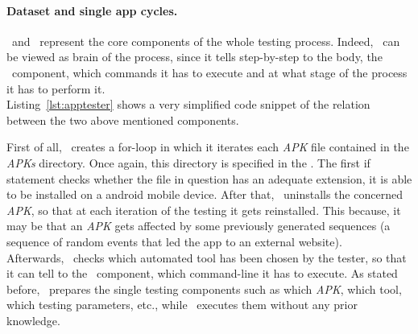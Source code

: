 \paragraph{Dataset and single app cycles. } 
\AppTester\ and \Cmd\ represent the core components of the whole testing process. Indeed, \AppTester\ can be viewed as brain of the process, since it tells step-by-step to the body, \ie the \Cmd\ component, which commands it has to execute and at what stage of the process it has to perform it. \\
Listing~\ref{lst:apptester} shows a very simplified code snippet of the relation between the two above mentioned components. 


First of all, \AppTester\ creates a for-loop in which it iterates each \textit{APK} file contained in the \textit{APKs} directory. Once again, this directory is specified in the \Config. 
The first if statement checks whether the file in question has an adequate extension, \ie it is able to be installed on a android mobile device. 
After that, \AppTester\ uninstalls the concerned \textit{APK}, so that at each iteration of the testing it gets reinstalled. 
This because, it may be that an \textit{APK} gets affected by some previously generated sequences (\eg a sequence of random events that led the app to an external website). \\
Afterwards, \AppTester\ checks which automated tool has been chosen by the tester, so that it can tell to the \Cmd\ component, which command-line it has to execute. As stated before, \AppTester\ prepares the single testing components such as which \textit{APK}, which tool, which testing parameters, etc., while \Cmd\ executes them without any prior knowledge. \\

